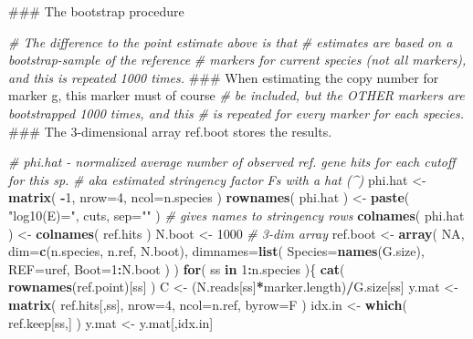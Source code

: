 \documentclass[]{article}
\newenvironment{Shaded}{\begin{snugshade}}{\end{snugshade}}
\newcommand{\KeywordTok}[1]{\textcolor[rgb]{0.13,0.29,0.53}{\textbf{#1}}}
\newcommand{\DataTypeTok}[1]{\textcolor[rgb]{0.13,0.29,0.53}{#1}}
\newcommand{\DecValTok}[1]{\textcolor[rgb]{0.00,0.00,0.81}{#1}}
\newcommand{\StringTok}[1]{\textcolor[rgb]{0.31,0.60,0.02}{#1}}
\newcommand{\CommentTok}[1]{\textcolor[rgb]{0.56,0.35,0.01}{\textit{#1}}}
\newcommand{\OtherTok}[1]{\textcolor[rgb]{0.56,0.35,0.01}{#1}}
\newcommand{\ControlFlowTok}[1]{\textcolor[rgb]{0.13,0.29,0.53}{\textbf{#1}}}
\newcommand{\OperatorTok}[1]{\textcolor[rgb]{0.81,0.36,0.00}{\textbf{#1}}}
\newcommand{\NormalTok}[1]{#1}
\begin{document}
\begin{Shaded}
\begin{Highlighting}[]
\NormalTok{### The bootstrap procedure}

\CommentTok{# The difference to the point estimate above is that}
\CommentTok{# estimates are based on a bootstrap-sample of the reference}
\CommentTok{# markers for current species (not all markers), and this is repeated 1000 times.}
\NormalTok{### When estimating the copy number for marker g, this marker must of course}
\CommentTok{# be included, but the OTHER markers are bootstrapped 1000 times, and this}
\CommentTok{# is repeated for every marker for each species.}
\NormalTok{### The 3-dimensional array ref.boot stores the results.}

\CommentTok{# phi.hat - normalized average number of observed ref. gene hits for each cutoff for this sp.}
\CommentTok{# aka estimated stringency factor Fs with a hat (^)}
\NormalTok{phi.hat <-}\StringTok{ }\KeywordTok{matrix}\NormalTok{( }\OperatorTok{-}\DecValTok{1}\NormalTok{, }\DataTypeTok{nrow=}\DecValTok{4}\NormalTok{, }\DataTypeTok{ncol=}\NormalTok{n.species )}
\KeywordTok{rownames}\NormalTok{( phi.hat ) <-}\StringTok{ }\KeywordTok{paste}\NormalTok{( }\StringTok{"log10(E)="}\NormalTok{, cuts, }\DataTypeTok{sep=}\StringTok{""}\NormalTok{ ) }\CommentTok{# gives names to stringency rows }
\KeywordTok{colnames}\NormalTok{( phi.hat ) <-}\StringTok{ }\KeywordTok{colnames}\NormalTok{( ref.hits )}
\NormalTok{N.boot <-}\StringTok{ }\DecValTok{1000}
\CommentTok{# 3-dim array}
\NormalTok{ref.boot <-}\StringTok{ }\KeywordTok{array}\NormalTok{( }\OtherTok{NA}\NormalTok{, }\DataTypeTok{dim=}\KeywordTok{c}\NormalTok{(n.species, n.ref, N.boot), }\DataTypeTok{dimnames=}\KeywordTok{list}\NormalTok{( }\DataTypeTok{Species=}\KeywordTok{names}\NormalTok{(G.size), }\DataTypeTok{REF=}\NormalTok{uref, }\DataTypeTok{Boot=}\DecValTok{1}\OperatorTok{:}\NormalTok{N.boot ) )}
\ControlFlowTok{for}\NormalTok{( ss }\ControlFlowTok{in} \DecValTok{1}\OperatorTok{:}\NormalTok{n.species )\{}
  \KeywordTok{cat}\NormalTok{( }\KeywordTok{rownames}\NormalTok{(ref.point)[ss] )}
\NormalTok{  C <-}\StringTok{ }\NormalTok{(N.reads[ss]}\OperatorTok{*}\NormalTok{marker.length)}\OperatorTok{/}\NormalTok{G.size[ss]}
\NormalTok{  y.mat <-}\StringTok{ }\KeywordTok{matrix}\NormalTok{( ref.hits[,ss], }\DataTypeTok{nrow=}\DecValTok{4}\NormalTok{, }\DataTypeTok{ncol=}\NormalTok{n.ref, }\DataTypeTok{byrow=}\NormalTok{F )}
\NormalTok{  idx.in <-}\StringTok{ }\KeywordTok{which}\NormalTok{( ref.keep[ss,] )}
\NormalTok{  y.mat <-}\StringTok{ }\NormalTok{y.mat[,idx.in]}

\end{Highlighting}
\end{Shaded}
\end{document}

